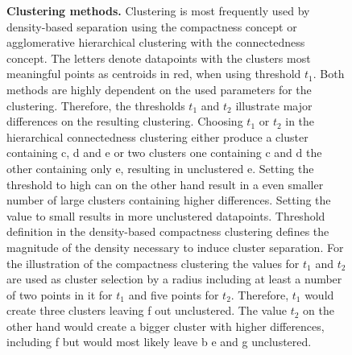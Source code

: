 \begin{figure}[!hbt]
\begin{subfigure}[b]{0.475\textwidth}
    \end{subfigure}
    \caption[Clustering methods]{\textbf{Clustering methods.} Clustering is most frequently used by density-based separation using the compactness concept or agglomerative hierarchical clustering with the connectedness concept. The letters denote datapoints with the clusters most meaningful points as centroids in red, when using threshold $t_1$. Both methods are highly dependent on the used parameters for the clustering. Therefore, the thresholds $t_1$ and $t_2$ illustrate major differences on the resulting clustering. Choosing $t_1$ or $t_2$ in the hierarchical connectedness clustering either produce a cluster containing c, d and e or two clusters one containing c and d the other containing only e, resulting in unclustered e. Setting the threshold to high can on the other hand result in a even smaller number of large clusters containing higher differences. Setting the value to small results in more unclustered datapoints. Threshold definition in the density-based compactness clustering defines the magnitude of the density necessary to induce cluster separation. For the illustration of the compactness clustering the values for $t_1$ and $t_2$ are used as cluster selection by a  radius including at least a number of two points in it for $t_1$ and five points for $t_2$. Therefore, $t_1$ would create three clusters leaving f out unclustered. The value $t_2$ on the other hand would create a bigger cluster with higher differences, including f but would most likely leave b e and g unclustered.}
    \label{fig:Methods}
\end{figure}

\vspace{1em}

